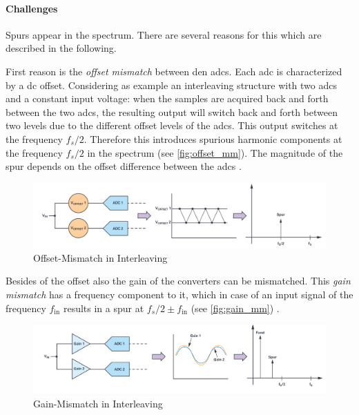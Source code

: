 \paragraph{Challenges}
Spurs appear in the spectrum. There are several reasons for this which are described in the following.

First reason is the \textit{offset mismatch} between den \glspl{adc}. 
Each \gls{adc} is characterized by a \gls{dc} offset. Considering as example an interleaving structure with two \glspl{adc} and a constant input voltage: when the samples are acquired back and forth between the two \glspl{adc}, the resulting output will switch back and forth between two levels due to the different offset levels of the \glspl{adc}. 
This output switches at the frequency $f_s/2$. Therefore this introduces spurious harmonic components at the frequency $f_s/2$ in the spectrum (see \autoref{fig:offset_mm}). 
The magnitude of the spur depends on the offset difference between the \glspl{adc} \cite{Harris2019}.

\begin{figure}[tbh]
	\centering
	\includegraphics[width = \textwidth]{chap/02-theory/img/offset_mm}
	\caption{Offset-Mismatch in Interleaving \cite{Harris2019}}
	\label{fig:offset_mm}
\end{figure}

Besides of the offset also the gain of the converters can be mismatched. 
This \textit{gain mismatch} has a frequency component to it, which in case of an input signal of the frequency $f_{\text{in}}$ results in a spur at $f_s/2 \pm f_{\text{in}}$ (see \autoref{fig:gain_mm}) \cite{Harris2019}.

\begin{figure}[tbh]
	\centering
	\includegraphics[width = \textwidth]{chap/02-theory/img/gain_mm}
	\caption{Gain-Mismatch in Interleaving \cite{Harris2019}}
	\label{fig:gain_mm}
\end{figure}

